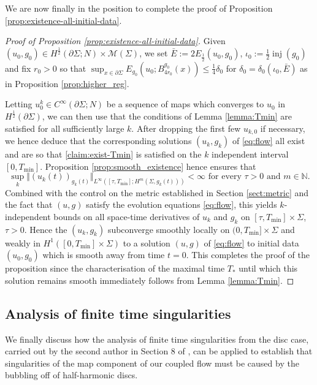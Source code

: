 \documentclass[10pt,reqno]{amsart}
\theoremstyle{plain}
\theoremstyle{definition}
\numberwithin{equation}{section}
\newcommand{\de}{\delta}
\newcommand{\Si}{\Sigma}
\newcommand{\N}{\ensuremath{{\mathbb N}}}
\DeclareMathOperator{\inj}{inj}
\newcommand{\norm}[1]{\Vert#1\Vert}
\newcommand{\half}{\frac{1}{2}}
\newcommand{\pSi}{{\partial \Sigma}}
\newcommand{\MM}{\mathcal{M}} %
\newcommand{\hf}{\frac{1}{2}} %
\newcommand{\p}{\partial} %
\begin{document}
We are now finally in the position to complete the proof of Proposition \ref{prop:existence-all-initial-data}.
\begin{proof}[Proof of Proposition \ref{prop:existence-all-initial-data}]
    Given $(u_0,g_0)\in H^{\half}(\pSi;N) \times \MM(\Si)$, we set $\bar{E} := 2E_\hf(u_0,g_0)$, $\iota_0:= \half \inj(g_0)$ and fix $r_0>0$ so that $\sup_{x\in \pSi}  E_{g_0}(u_0; B_{4r_0}^{g_0}(x))\leq \frac14 \de_0$ for $\de_0=\de_0(\iota_0,\bar E)$ as in Proposition \ref{prop:higher_reg}.

    Letting $u_0^{k} \in C^\infty(\p\Si;N)$ be a sequence of maps which converges to $u_0$ in $H^\hf(\p\Si)$, we can then use that  the conditions of Lemma \ref{lemma:Tmin} are satisfied for all sufficiently large $k$. After dropping the first few $u_{k,0}$ if necessary, we hence deduce that the corresponding solutions $(u_k,g_k)$ of \eqref{eq:flow} all exist and are so that \eqref{claim:exist-Tmin} is satisfied on the $k$ independent interval $[0,T_{\min}]$. Proposition \ref{prop:smooth_existence} hence ensures that 
	\begin{equation*}\sup\limits_{k}\norm{(u_k(t))_{g_k(t)}}_{L^\infty([\tau,T_{\min}];H^m(\Si,g_k(t)))} <\infty \text{ for every } \tau>0 \text{ and } m\in\N. 
	\end{equation*}
    Combined with the control on the metric established in Section \ref{sect:metric} and the fact that $(u,g)$ satisfy the evolution equations \eqref{eq:flow}, this yields $k$-independent bounds on all space-time derivatives of $u_k$ and $g_k$ on $[\tau,T_{\min}]\times \Si$, $\tau>0$. Hence the $(u_k,g_k)$ subconverge smoothly locally on $(0,T_{\min}]\times \Si$ and weakly in $H^1([0,T_{\min}]\times \Si)$ to a solution
    $(u,g)$ of \eqref{eq:flow} to initial data $(u_0,g_0)$ which is smooth away from time $t=0$.    
    This completes the proof of the proposition since the characterisation of the maximal time $T_*$ until which this solution remains smooth immediately follows from Lemma \ref{lemma:Tmin}.
\end{proof}



\subsection{Analysis of finite time singularities}\label{sect:bubble} 

We finally discuss how the analysis of finite time singularities from the disc case, carried out by the second author in Section 8 of \cite{S}, can be applied to establish that singularities of the map component of our coupled flow must be caused by the bubbling off of half-harmonic discs.
\end{document}
